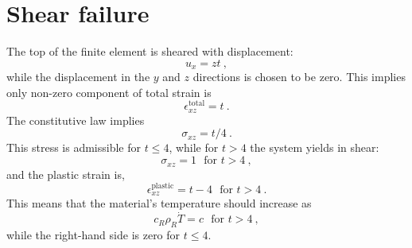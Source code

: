 \section{Shear failure}

The top of the finite element is sheared with displacement:
\begin{equation}
u_{x} = zt \ ,
\end{equation}
while the displacement in the $y$ and $z$ directions is chosen to be
zero.  This implies only non-zero component of total strain is
\begin{equation}
\epsilon^{\mathrm{total}}_{xz} = t \ .
\end{equation}
The constitutive law implies
\begin{equation}
\sigma_{xz} = t/4 \ .
\end{equation}
This stress is admissible for $t\leq 4$, while for $t>4$ the system
yields in shear:
\begin{equation}
\sigma_{xz} = 1 \ \ \ \mbox{for } t>4 \ ,
\end{equation}
and the plastic strain is,
\begin{equation}
\epsilon^{\mathrm{plastic}}_{xz} = t - 4 \ \ \ \mbox{for } t>4 \ .
\end{equation}
This means that the material's temperature should increase as
\begin{equation}
c_{R}\rho_{R}\dot{T} = c \ \ \ \mbox{for } t>4 \ ,
\end{equation}
while the right-hand side is zero for $t\leq 4$.
